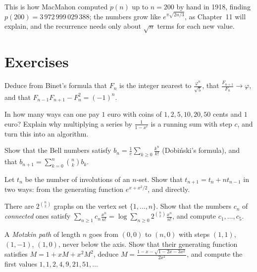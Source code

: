 This is how MacMahon computed $p(n)$ up to $n=200$ by hand in 1918, finding $p(200)=3\,972\,999\,029\,388$; the
numbers grow like $e^{\pi\sqrt{2n/3}}$, as Chapter~11 will explain, and the recurrence needs only about $\sqrt n$ terms
for each new value.

\section{Exercises}

\begin{exercise}[$\star$]\label{ex:binet}
Deduce from Binet's formula that $F_n$ is the integer nearest to $\frac{\varphi^n}{\sqrt5}$, that
$\frac{F_{n+1}}{F_n}\to\varphi$, and that $F_{n-1}F_{n+1}-F_n^2=(-1)^n$.
\end{exercise}

\begin{exercise}[$\star$]\label{ex:change}
In how many ways can one pay $1$ euro with coins of $1,2,5,10,20,50$ cents and $1$ euro? Explain why multiplying a
series by $\frac1{1-x^c}$ is a running sum with step $c$, and turn this into an algorithm.
\end{exercise}

\begin{exercise}[$\star\star$]\label{ex:dobinski}
Show that the Bell numbers satisfy $b_n=\frac1e\sum_{k\ge0}\frac{k^n}{k!}$ (Dobi\'nski's formula), and that
$b_{n+1}=\sum_{k=0}^n\binom nkb_k$.
\end{exercise}

\begin{exercise}[$\star\star$]\label{ex:involutions}
Let $t_n$ be the number of involutions of an $n$-set. Show that $t_{n+1}=t_n+nt_{n-1}$ in two ways: from the generating
function $e^{x+x^2/2}$, and directly.
\end{exercise}

\begin{exercise}[$\star\star$]\label{ex:connected}
There are $2^{\binom n2}$ graphs on the vertex set $\{1,\dots,n\}$. Show that the numbers $c_n$ of \emph{connected}
ones satisfy $\sum_{n\ge1}c_n\frac{x^n}{n!}=\log\sum_{n\ge0}2^{\binom n2}\frac{x^n}{n!}$, and compute $c_1,\dots,c_5$.
\end{exercise}

\begin{exercise}[$\star$]\label{ex:motzkin}
A \emph{Motzkin path} of length $n$ goes from $(0,0)$ to $(n,0)$ with steps $(1,1)$, $(1,-1)$, $(1,0)$, never below the
axis. Show that their generating function satisfies $M=1+xM+x^2M^2$, deduce $M=\frac{1-x-\sqrt{1-2x-3x^2}}{2x^2}$, and
compute the first values $1,1,2,4,9,21,51,\dots$
\end{exercise}

